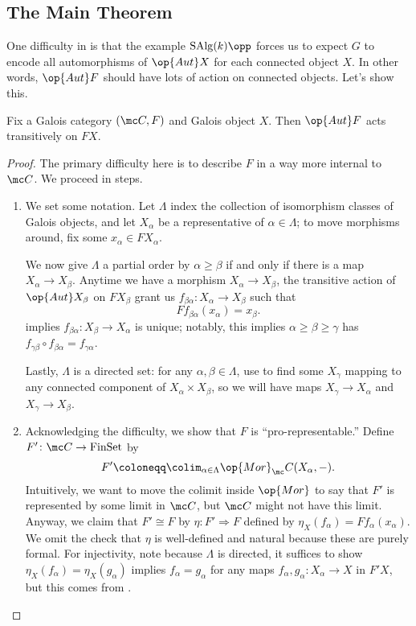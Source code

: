 \documentclass{amsart}
\begin{document}
\subsection{The Main Theorem} \label{subsec:main-galois-thm}
One difficulty in  is that the example $\mathrm{SAlg}(k)\opp$ forces us to expect $G$ to encode all automorphisms of $\op{Aut}X$ for each connected object $X$. In other words, $\op{Aut}F$ should have lots of action on connected objects. Let's show this.
\begin{proposition} \label{prop:galois-transitive}
    Fix a Galois category $(\mc C,F)$ and Galois object $X$. Then $\op{Aut}F$ acts transitively on $FX$.
\end{proposition}
\begin{proof}
    The primary difficulty here is to describe $F$ in a way more internal to $\mc C$. We proceed in steps.
    \begin{enumerate}
        \item We set some notation. Let $\Lambda$ index the collection of isomorphism classes of Galois objects, and let $X_\alpha$ be a representative of $\alpha\in\Lambda$; to move morphisms around, fix some $x_\alpha\in FX_\alpha$.

        We now give $\Lambda$ a partial order by $\alpha\ge\beta$ if and only if there is a map $X_\alpha\to X_{\beta}$. Anytime we have a morphism $X_\alpha\to X_{\beta}$, the transitive action of $\op{Aut}X_{\beta}$ on $FX_{\beta}$ grant us $f_{\beta\alpha}\colon X_\alpha\to X_{\beta}$ such that
        \[Ff_{\beta\alpha}(x_\alpha)=x_{\beta}.\]
         implies $f_{\beta\alpha}\colon X_{\beta}\to X_\alpha$ is unique; notably, this implies $\alpha\ge\beta\ge\gamma$ has $f_{\gamma\beta}\circ f_{\beta\alpha}=f_{\gamma\alpha}$.

        Lastly, $\Lambda$ is a directed set: for any $\alpha,\beta\in\Lambda$, use  to find some $X_\gamma$ mapping to any connected component of $X_\alpha\times X_\beta$, so we will have maps $X_\gamma\to X_\alpha$ and $X_\gamma\to X_\beta$.

        \item \label{item:pro-rep-fiber} Acknowledging the difficulty, we show that $F$ is ``pro-representable.'' Define $F'\colon\mc C\to\mathrm{FinSet}$ by
        \[F'\coloneqq\colim_{\alpha\in\Lambda}\op{Mor}_\mc C(X_\alpha,-).\]
        Intuitively, we want to move the colimit inside $\op{Mor}$ to say that $F'$ is represented by some limit in $\mc C$, but $\mc C$ might not have this limit. Anyway, we claim that $F'\cong F$ by $\eta\colon F'\Rightarrow F$ defined by $\eta_X(f_\alpha)=Ff_\alpha(x_\alpha)$. We omit the check that $\eta$ is well-defined and natural because these are purely formal. For injectivity, note because $\Lambda$ is directed, it suffices to show $\eta_X(f_\alpha)=\eta_X(g_\alpha)$ implies $f_\alpha=g_\alpha$ for any maps $f_\alpha,g_\alpha\colon X_\alpha\to X$ in $F'X$, but this comes from .


\end{enumerate}
\end{proof}
\end{document}
